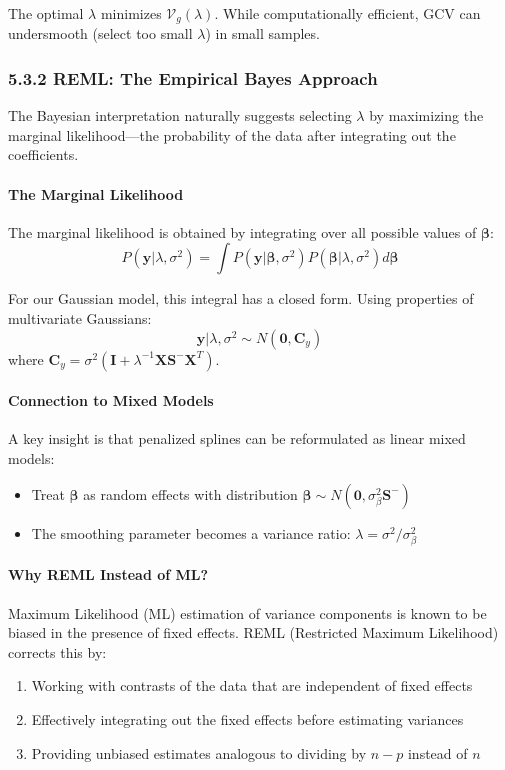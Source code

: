 \documentclass[11pt, a4paper]{article}
\begin{document}
The optimal $\lambda$ minimizes $\mathcal{V}_g(\lambda)$. While computationally efficient, GCV can undersmooth (select too small $\lambda$) in small samples.

\subsubsection{5.3.2 REML: The Empirical Bayes Approach}
The Bayesian interpretation naturally suggests selecting $\lambda$ by maximizing the marginal likelihood—the probability of the data after integrating out the coefficients.

\paragraph{The Marginal Likelihood}
The marginal likelihood is obtained by integrating over all possible values of $\boldsymbol{\beta}$:
\[ P(\mathbf{y}|\lambda, \sigma^2) = \int P(\mathbf{y}|\boldsymbol{\beta}, \sigma^2) P(\boldsymbol{\beta}|\lambda, \sigma^2) d\boldsymbol{\beta} \]

For our Gaussian model, this integral has a closed form. Using properties of multivariate Gaussians:
\[ \mathbf{y}|\lambda, \sigma^2 \sim N(\mathbf{0}, \mathbf{C}_y) \]
where $\mathbf{C}_y = \sigma^2(\mathbf{I} + \lambda^{-1}\mathbf{X}\mathbf{S}^{-}\mathbf{X}^T)$.

\paragraph{Connection to Mixed Models}
A key insight is that penalized splines can be reformulated as linear mixed models:
\begin{itemize}
\item Treat $\boldsymbol{\beta}$ as random effects with distribution $\boldsymbol{\beta} \sim N(\mathbf{0}, \sigma^2_{\beta}\mathbf{S}^{-})$
\item The smoothing parameter becomes a variance ratio: $\lambda = \sigma^2/\sigma^2_{\beta}$
\end{itemize}

\paragraph{Why REML Instead of ML?}
Maximum Likelihood (ML) estimation of variance components is known to be biased in the presence of fixed effects. REML (Restricted Maximum Likelihood) corrects this by:
\begin{enumerate}
\item Working with contrasts of the data that are independent of fixed effects
\item Effectively integrating out the fixed effects before estimating variances
\item Providing unbiased estimates analogous to dividing by $n-p$ instead of $n$
\end{enumerate}
\end{document}
